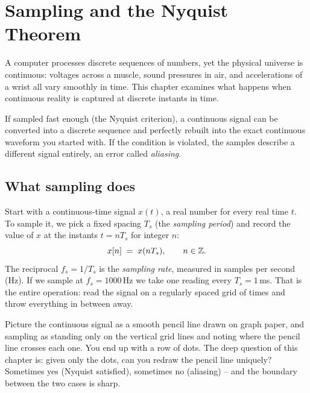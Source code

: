 \chapter{Sampling and the Nyquist Theorem}

A computer processes discrete sequences of numbers, yet the physical universe is continuous:
voltages across a muscle, sound pressures in air, and accelerations of a wrist all vary
smoothly in time. This chapter examines what happens when continuous reality is captured at discrete instants in time.

If sampled fast enough (the Nyquist criterion), a continuous signal can be converted into a discrete sequence and perfectly rebuilt into the exact continuous waveform you started with. If the condition is violated, the samples describe a different signal entirely, an error called \emph{aliasing}.

\section{What sampling does}
\label{ch18:what-sampling-does}

Start with a continuous-time signal $x(t)$, a real number for every real time $t$.
To sample it, we pick a fixed spacing $T_s$ (the \emph{sampling period}) and record
the value of $x$ at the instants $t = nT_s$ for integer $n$:
\[
  x[n] \;=\; x(nT_s), \qquad n \in \mathbb{Z} .
\]
The reciprocal $f_s = 1/T_s$ is the \emph{sampling rate}, measured in samples per
second (Hz). If we sample at $f_s = 1000$\,Hz we take one reading every
$T_s = 1$\,ms. That is the entire operation: read the signal on a regularly spaced
grid of times and throw everything in between away.

\begin{intuitionbox}
Picture the continuous signal as a smooth pencil line drawn on graph paper, and
sampling as standing only on the vertical grid lines and noting where the pencil
line crosses each one. You end up with a row of dots. The deep question of this
chapter is: given only the dots, can you redraw the pencil line uniquely? Sometimes
yes (Nyquist satisfied), sometimes no (aliasing) -- and the boundary between the two
cases is sharp.
\end{intuitionbox}

